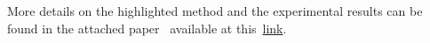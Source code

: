 
More details on the highlighted method and the experimental results can be found in the attached paper~\cite{kopicki2015oneshot} available at this~\href{./attachedPapers/GraspingNovelObjects.pdf}{link}. 
